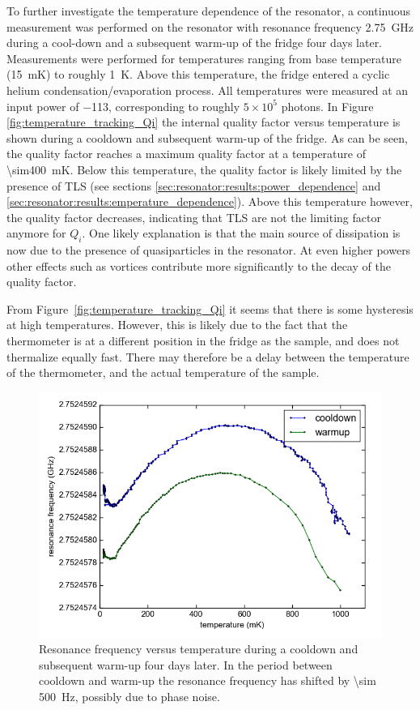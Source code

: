 To further investigate the temperature dependence of the resonator, a continuous measurement was performed on the resonator with resonance frequency \SI{2.75}{\giga \hertz} during a cool-down and a subsequent warm-up of the fridge four days later. Measurements were performed for temperatures ranging from base temperature (\SI{15}{\milli \kelvin}) to roughly \SI{1}{\kelvin}. Above this temperature, the fridge entered a cyclic helium condensation/evaporation process. All temperatures were measured at an input power of \SI{-113}{\dBm}, corresponding to roughly $5 \times 10^5$ photons. In Figure \ref{fig:temperature_tracking_Qi} the internal quality factor versus temperature is shown during a cooldown and subsequent warm-up of the fridge. As can be seen, the quality factor reaches a maximum quality factor at a temperature of \SI{\sim400}{\milli \kelvin}. Below this temperature, the quality factor is likely limited by the presence of TLS (see sections \ref{sec:resonator:results:power_dependence} and \ref{sec:resonator:results:emperature_dependence}). Above this temperature however, the quality factor decreases, indicating that TLS are not the limiting factor anymore for $Q_i$. One likely explanation is that the main source of dissipation is now due to the presence of quasiparticles in the resonator. At even higher powers other effects such as vortices contribute more significantly to the decay of the quality factor.

From Figure~\ref{fig:temperature_tracking_Qi} it seems that there is some hysteresis at high temperatures. However, this is likely due to the fact that the thermometer is at a different position in the fridge as the sample, and does not thermalize equally fast. There may therefore be a delay between the temperature of the thermometer, and the actual temperature of the sample.

\begin{figure}[h!]
    \centering
    \includegraphics[width=.72\textwidth]{Figures/DRIE/Temperature tracking - f0 vs T.png}
    \caption{Resonance frequency versus temperature during a cooldown and subsequent warm-up four days later. In the period between cooldown and warm-up the resonance frequency has shifted by \SI{\sim 500}{\hertz}, possibly due to phase noise.}
    \label{fig:temperature_tracking_f0}
\end{figure}


